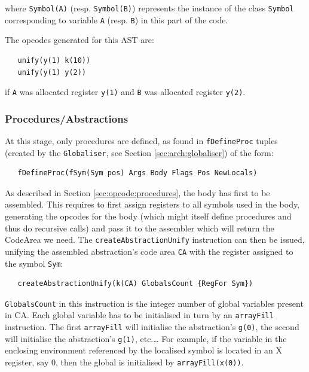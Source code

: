 \documentclass[a4paper]{memoir}
\begin{document}
where \lstinline!Symbol(A)! (resp. \lstinline!Symbol(B)!) represents the instance of the class \lstinline!Symbol! corresponding to variable \lstinline!A! (resp. \lstinline!B!) in this part of the code. 

The opcodes generated for this AST are:

\begin{lstlisting}
   unify(y(1) k(10))
   unify(y(1) y(2))
\end{lstlisting}
if \lstinline!A! was allocated register \lstinline!y(1)! and \lstinline!B! was
allocated register \lstinline!y(2)!.


\subsubsection{Procedures/Abstractions}\label{sec:codegen:procedures}
At this stage, only procedures are defined, as found in \lstinline!fDefineProc! tuples (created by the \lstinline!Globaliser!, see Section \ref{sec:arch:globaliser}) of the form:
\begin{lstlisting}
   fDefineProc(fSym(Sym pos) Args Body Flags Pos NewLocals)
\end{lstlisting}
As described in Section \ref{sec:opcode:procedures}, the body has first to be assembled. This requires to first assign registers to all symbols used in the body, generating the opcodes for the body (which might itself define procedures and thus do recursive calls) and pass it to the assembler which will return the CodeArea we need.
The \lstinline!createAbstractionUnify! instruction can then be issued, unifying the assembled abstraction's code area \lstinline!CA! with the register assigned to the symbol \lstinline!Sym!:
\begin{lstlisting}
   createAbstractionUnify(k(CA) GlobalsCount {RegFor Sym})
\end{lstlisting}
\lstinline!GlobalsCount! in this instruction is the integer number of global variables present in CA. Each global variable has to be initialised in turn by an \lstinline!arrayFill! instruction. The first \lstinline!arrayFill! will initialise the abstraction's \lstinline!g(0)!, the second will initialise the abstraction's \lstinline!g(1)!, etc.\ldots
For example, if the variable in the enclosing environment referenced by the localised symbol
is located in an X register, say 0, then the global is initialised by
\lstinline!arrayFill(x(0))!. 
\end{document}
